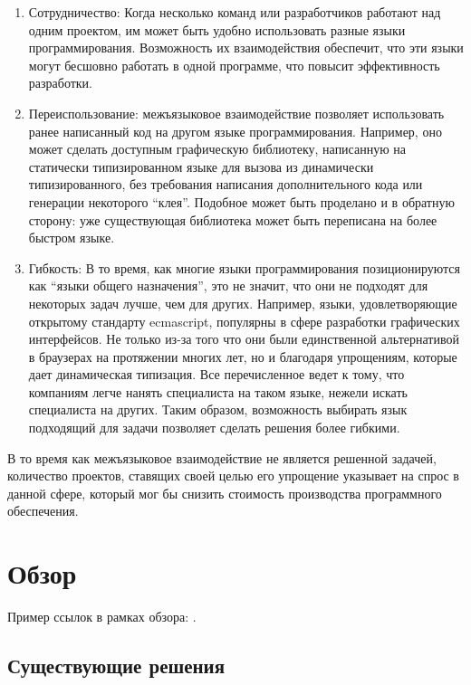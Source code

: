 \documentclass[times,specification,annotation]{itmo-student-thesis}
\begin{document}
\begin{enumerate}
\item Сотрудничество: Когда несколько команд или разработчиков работают над одним проектом, им может быть удобно использовать разные языки программирования. Возможность их взаимодействия обеспечит, что эти языки могут бесшовно работать в одной программе, что повысит эффективность разработки.

\item Переиспользование: межъязыковое взаимодействие позволяет использовать ранее написанный код на другом языке программирования. Например, оно может сделать доступным графическую библиотеку, написанную на статически типизированном языке для вызова из динамически типизированного, без требования написания дополнительного кода или генерации некоторого ``клея''. Подобное может быть проделано и в обратную сторону: уже существующая библиотека может быть переписана на более быстром языке.

\item Гибкость: В то время, как многие языки программирования позиционируются как ``языки общего назначения'', это не значит, что они не подходят для некоторых задач лучше, чем для других. Например, языки, удовлетворяющие открытому стандарту ecmascript, популярны в сфере разработки графических интерфейсов. Не только из-за того что они были единственной альтернативой в браузерах на протяжении многих лет, но и благодаря упрощениям, которые дает динамическая типизация. Все перечисленное ведет к тому, что компаниям легче нанять специалиста на таком языке, нежели искать специалиста на других. Таким образом, возможность выбирать язык подходящий для задачи позволяет сделать решения более гибкими.
\end{enumerate}

В то время как межъязыковое взаимодействие не является решенной задачей, количество проектов, ставящих своей целью его упрощение указывает на спрос в данной сфере, который мог бы снизить стоимость производства программного обеспечения.

\chapter{Обзор}

\startrelatedwork
Пример ссылок в рамках обзора: \cite{example-english, example-russian, unrestricted-jump-evco, doerr-doerr-lambda-lambda-self-adjustment-arxiv}.

\section{Существующие решения}
\end{document}
